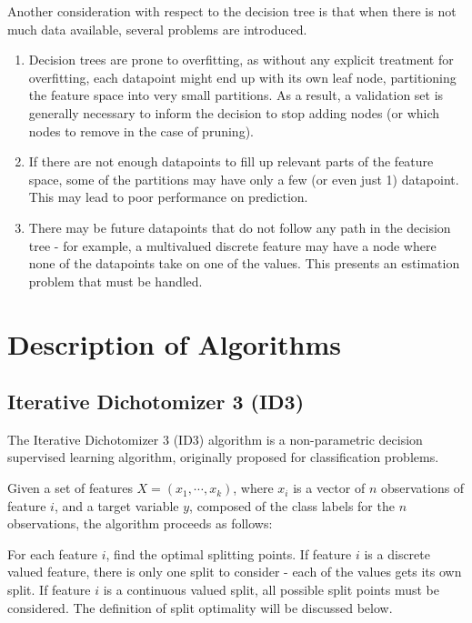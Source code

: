 \documentclass{amsart}
\begin{document}
    Another consideration with respect to the decision tree is that when there is not much data available,
    several problems are introduced.
    \begin{enumerate}
        \item Decision trees are prone to overfitting, as without any explicit treatment for overfitting, each
        datapoint might end up with its own leaf node, partitioning the feature space into very small partitions. As
        a result, a validation set is generally necessary to inform the decision to stop adding nodes (or which nodes to
        remove in the case of pruning).
        \item If there are not enough datapoints to fill up relevant parts of the feature space, some of the
        partitions may have only a few (or even just  1) datapoint. This may lead to poor performance on prediction.
        \item There may be future datapoints that do not follow any path in the decision tree - for example,
        a multivalued discrete feature may have a node where none of the datapoints take on one of the values.
        This presents an estimation problem that must be handled.
    \end{enumerate}

    \section{Description of Algorithms}
    \subsection{Iterative Dichotomizer 3 (ID3)}
    The Iterative Dichotomizer 3 (ID3)\cite{id3} algorithm
    is a non-parametric decision supervised learning algorithm, originally proposed for
    classification problems.

    Given a set of features $X = (x_1, \cdots, x_k)$, where $x_i$ is a vector
    of $n$ observations of feature $i$, and a target variable $y$, composed of the
    class labels for the $n$ observations, the algorithm proceeds as follows:

    For each feature $i$, find the optimal splitting points. If feature $i$ is a
    discrete valued feature, there is only one split to consider - each of the values gets its own
    split. If feature $i$ is a continuous valued split, all possible split points must be considered.
    The definition of split optimality will be discussed below.
\end{document}
